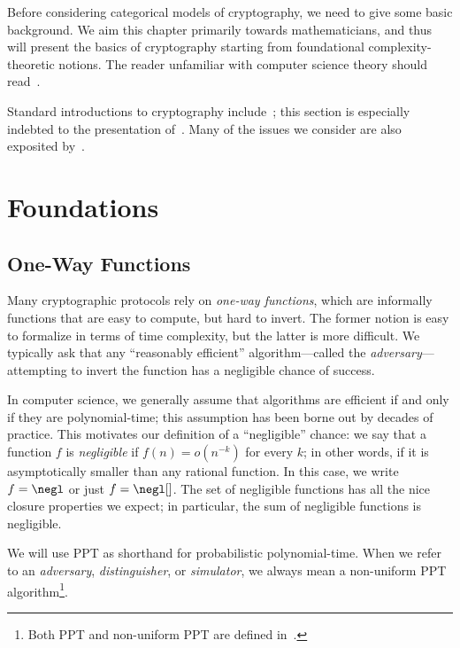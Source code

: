 Before considering categorical models of cryptography, we need to give some
basic background. We aim this chapter primarily towards mathematicians, and thus
will present the basics of cryptography starting from foundational
complexity-theoretic notions. The reader unfamiliar with computer science theory
should read~.

Standard introductions to cryptography include~\cite{katz-lindell-2014,
pass-shelat-2020, rosulek-2021}; this section is especially indebted to the
presentation of~\cite{pass-shelat-2020}. Many of the issues we consider are also
exposited by~\cite{lindell-2017}.

\section{Foundations}

\subsection{One-Way Functions}

Many cryptographic protocols rely on \emph{one-way functions}, which are
informally functions that are easy to compute, but hard to invert. The former
notion is easy to formalize in terms of time complexity, but the latter is more
difficult. We typically ask that any ``reasonably efficient'' algorithm---called
the \emph{adversary}---attempting to invert the function has a negligible chance
of success.

In computer science, we generally assume that algorithms are efficient if and
only if they are polynomial-time; this assumption has been borne out by decades
of practice. This motivates our definition of a ``negligible'' chance: we say
that a function $f$ is \emph{negligible} if $f(n) = o(n^{-k})$
for every $k$; in other words, if it is asymptotically smaller than any rational
function. In this case, we write $f = \negl$ or just $f = \negl[]$. The set
of negligible functions has all the nice closure properties we expect; in
particular, the sum of negligible functions is negligible.


\begin{ntn}
  We will use PPT as shorthand for probabilistic polynomial-time. When we refer
  to an \emph{adversary}, \emph{distinguisher}, or \emph{simulator}, we always
  mean a non-uniform PPT algorithm\footnote{Both PPT and non-uniform PPT are defined
  in~.}.
\end{ntn}

